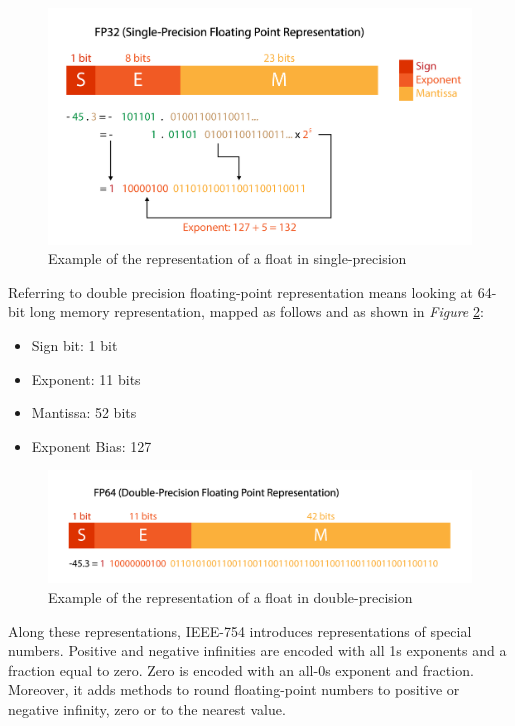 \begin{figure}[htbp]
	\centering
		\includegraphics[width=.8\textwidth]{Figures/FP32.png}
	\caption[Single-precision float representation]{Example of the representation of a float in single-precision}
	\label{fig:FP32}
\end{figure}

Referring to double precision floating-point representation means looking at 64-bit long memory representation, mapped as follows and as shown in \emph{Figure} \ref{fig:FP64}:
\begin{itemize}
  \item Sign bit: 1 bit
  \item Exponent: 11 bits
  \item Mantissa: 52 bits
  \item Exponent Bias: 127
\end{itemize}

\begin{figure}[htbp]
	\centering
		\includegraphics[width=.8\textwidth]{Figures/FP64.png}
	\caption[Double-precision float representation]{Example of the representation of a float in double-precision}
	\label{fig:FP64}
\end{figure}

Along these representations, IEEE-754 introduces representations of special numbers. Positive and negative infinities are encoded with all 1s exponents and a fraction equal to zero. Zero is encoded with an all-0s exponent and fraction. Moreover, it adds methods to round floating-point numbers to positive or negative infinity, zero or to the nearest value.


